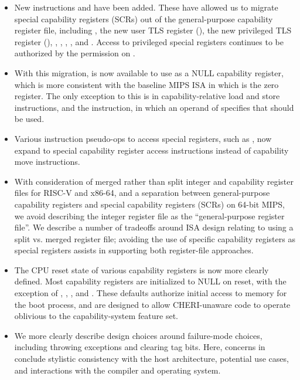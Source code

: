 \begin{itemize}
\item New instructions  and  have
been added.
These have allowed us to migrate special capability registers (SCRs) out of
the general-purpose capability register file, including \DDC{}, the new user
TLS register (\CULR{}), the new privileged TLS register (\CPLR{}), \KRC{},
\KQC{}, \KCC{}, \KDC{}, and \EPCC{}.
Access to privileged special registers continues to be authorized by the
\cappermASR permission on \PCC{}.

\item With this migration,  is now available to use as a NULL
capability register, which is more consistent with the baseline MIPS ISA in
which  is the zero register.
The only exception to this is in capability-relative load and store
instructions, and the  instruction, in
which an operand of  specifies that \DDC{} should be used.

\item Various instruction pseudo-ops to access special registers, such as
, now expand to special capability register access
instructions instead of capability move instructions.

\item With consideration of merged rather than split integer and capability
register files for RISC-V and x86-64, and a separation between
general-purpose capability registers and special capability registers (SCRs) on 64-bit MIPS, we
avoid describing the integer register file as the ``general-purpose register
file''.
We describe a number of tradeoffs around ISA design relating to using a
split vs. merged register file; avoiding the use of specific capability
registers as special registers assists in supporting both register-file
approaches.

\item The CPU reset state of various capability registers is now more clearly
defined.
Most capability registers are initialized to NULL on reset, with the
exception of \DDC{}, \PCC{}, \KCC{}, and \EPCC{}.
These defaults authorize initial access to memory for the boot process, and
are designed to allow CHERI-unaware code to operate oblivious to the
capability-system feature set.

\item We more clearly describe design choices around failure-mode choices,
including throwing exceptions and clearing tag bits.
Here, concerns in conclude stylistic consistency with the host architecture,
potential use cases, and interactions with the compiler and operating
system.


\end{itemize}

